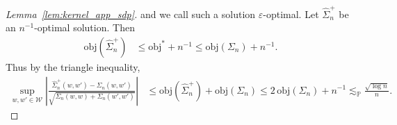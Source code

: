 \documentclass[11pt,lof]{puthesis}
\renewcommand{\P}{\ensuremath{\mathbb{P}}}
\newcommand{\cW}{\ensuremath{\mathcal{W}}}
\newcommand{\objective}{\ensuremath{\mathrm{obj}}}
\theoremstyle{break}
\theoremstyle{proof}
\newtheorem{proof}{Proof}
\begin{document}
\begin{proof}[Lemma~\ref{lem:kernel_app_sdp}]
  and we call such a solution $\varepsilon$-optimal.
  Let $\hat \Sigma_n^+$ be an $n^{-1}$-optimal solution.
  Then
  \begin{align*}
    \objective(\hat \Sigma_n^+)
    &\leq \objective^* + n^{-1}
    \leq \objective(\Sigma_n) + n^{-1}.
  \end{align*}
  Thus by the triangle inequality,
  \begin{align*}
    \sup_{w,w' \in \cW}
    \left|
      \frac{\hat \Sigma_n^+(w,w') - \Sigma_n(w,w')}
      {\sqrt{\Sigma_n(w,w) + \Sigma_n(w',w')}}
    \right|
    &\leq
    \objective(\hat \Sigma_n^+)
    + \objective(\Sigma_n)
    \leq 2 \, \objective(\Sigma_n) + n^{-1}
    \lesssim_\P
    \frac{\sqrt{\log n}}{n}.
  \end{align*}
\end{proof}
\end{document}
